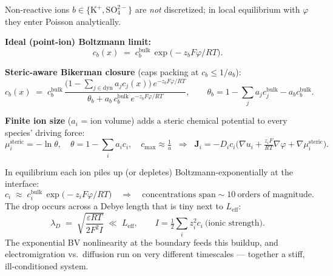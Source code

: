 \documentclass[11pt]{article}
\newcommand{\Jbf}{\mathbf{J}}
\begin{document}
\begin{tcolorbox}[cardstyle={Slide 12 (cont.) --- Analytic Bikerman counterions \& steric crowding}]
Non-reactive ions $b\in\{\mathrm{K^+},\mathrm{SO_4^{2-}}\}$ are \emph{not}
discretized; in local equilibrium with $\varphi$ they enter Poisson
analytically.

\textbf{Ideal (point-ion) Boltzmann limit:}
\[
  c_b(x) \;=\; c_b^{\mathrm{bulk}}\,\exp\!\big(-z_b F\varphi/RT\big).
\]

\textbf{Steric-aware Bikerman closure} (caps packing at $c_b\le 1/a_b$):
\[
  c_b(x) \;=\; c_b^{\mathrm{bulk}}\,
  \frac{\big(1 - \sum_{j\in\mathrm{dyn}} a_j c_j(x)\big)\,
        e^{-z_b F\varphi/RT}}
       {\theta_b + a_b\,c_b^{\mathrm{bulk}}\,e^{-z_b F\varphi/RT}},
  \qquad
  \theta_b = 1 - \!\sum_j a_j c_j^{\mathrm{bulk}} - a_b c_b^{\mathrm{bulk}}.
\]

\textbf{Finite ion size} ($a_i$ = ion volume) adds a steric chemical
potential to every species' driving force:
\[
  \mu_i^{\mathrm{steric}} = -\ln\theta,\quad
  \theta = 1 - \sum_i a_i c_i,\quad
  c_{\max}\approx \tfrac{1}{a}
  \;\;\Rightarrow\;\;
  \Jbf_i = -D_i c_i\big(\nabla u_i + \tfrac{z_iF}{RT}\nabla\varphi
                        + \nabla\mu_i^{\mathrm{steric}}\big).
\]
\end{tcolorbox}

\begin{tcolorbox}[cardstyle={Slide 13 --- Why it is numerically hard}]
In equilibrium each ion piles up (or depletes) Boltzmann-exponentially
at the interface:
\[
  c_i \;\approx\; c_i^{\mathrm{bulk}}\,\exp\!\big(-z_i F\varphi/RT\big)
  \quad\Longrightarrow\quad
  \text{concentrations span} \sim 10\ \text{orders of magnitude.}
\]
The drop occurs across a Debye length that is tiny next to $L_{\mathrm{eff}}$:
\[
  \lambda_D \;=\; \sqrt{\dfrac{\varepsilon RT}{2F^2 I}}\;\ll\; L_{\mathrm{eff}},
  \qquad I = \tfrac12\textstyle\sum_i z_i^2 c_i\ \text{(ionic strength).}
\]
The exponential BV nonlinearity at the boundary feeds this buildup, and
electromigration vs.\ diffusion run on very different timescales ---
together a stiff, ill-conditioned system.
\end{tcolorbox}
\end{document}
